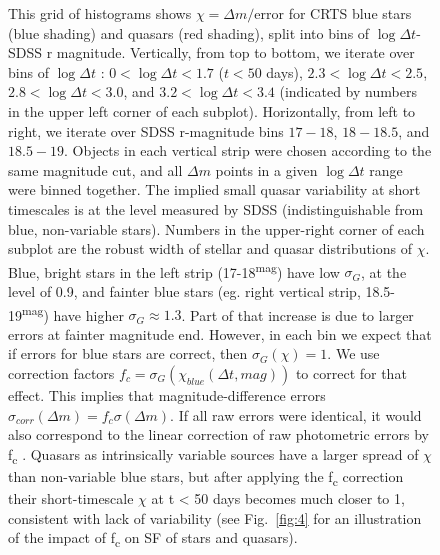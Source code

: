 \documentclass[fleqn,usenatbib]{mnras}  %
\begin{document}
\begin{figure}
 \caption{This grid of histograms shows $\chi = \Delta m / \mathrm{error}$ for CRTS blue stars (blue shading) and quasars (red shading), split into bins of $\log{\Delta t}$- SDSS r magnitude. Vertically, from top to bottom, we iterate over bins of $\log{\Delta t}$ : $0<\log{\Delta t}<1.7$ ($t < 50 $ days), $2.3<\log{\Delta t}<2.5$, $2.8<\log{\Delta t}<3.0$, and $3.2<\log{\Delta t}<3.4$ (indicated by numbers in the upper left corner of each subplot). Horizontally, from left to right, we iterate over SDSS r-magnitude bins $17-18$,  $18-18.5$, and $18.5-19$. Objects in each vertical strip were chosen according to the same magnitude cut, and all $\Delta m$ points in a given  $\log{\Delta t}$ range were binned together. The  implied small quasar variability at short timescales is at the level  measured by SDSS (indistinguishable from blue, non-variable stars). Numbers in the upper-right corner of each subplot are the robust width of stellar  and quasar  distributions of $\chi$. Blue, bright  stars in the left strip (17-18\textsuperscript{mag}) have low $\sigma_{G}$, at the level of 0.9, and fainter blue stars (eg. right vertical strip, 18.5-19\textsuperscript{mag}) have higher $\sigma_{G} \approx 1.3$. Part of that increase is due to larger errors at fainter magnitude end. However, in each bin we expect that if errors for blue stars are correct, then  $\sigma_{G}(\chi) = 1$. We use  correction factors $f_{c} = \sigma_{G}(\chi_{blue}(\Delta t, mag))$ to correct for that effect. This implies that magnitude-difference errors  $\sigma_{corr} (\Delta m) = f_{c}\sigma (\Delta m) $. If all raw errors were identical, it would also correspond to the linear correction of raw photometric errors by f\textsubscript{c} . Quasars  as intrinsically variable sources have a larger spread of $\chi$ than non-variable blue stars, but after applying the f\textsubscript{c} correction their short-timescale $\chi$ at t < 50 days becomes much closer to 1, consistent with lack of variability (see Fig.~\ref{fig:4} for an illustration of the impact of f\textsubscript{c} on SF of stars and quasars).}
\end{figure}

\end{document}
